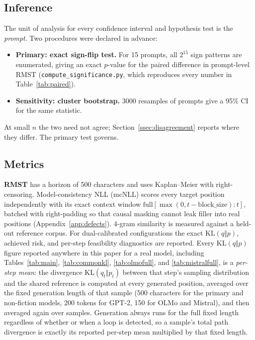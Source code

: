 \documentclass[11pt]{article}
\newcommand{\KL}{\mathrm{KL}}
\begin{document}
\subsection{Inference}
\label{ssec:inference}
The unit of analysis for every confidence interval and hypothesis test is the \emph{prompt}. Two procedures were declared in advance:
\begin{itemize}[leftmargin=*]
  \item \textbf{Primary: exact sign-flip test.} For 15 prompts, all $2^{15}$ sign patterns are enumerated, giving an exact $p$-value for the paired difference in prompt-level RMST (\texttt{compute\_\allowbreak{}significance.py}, which reproduces every number in Table~\ref{tab:paired}).
  \item \textbf{Sensitivity: cluster bootstrap.} 3000 resamples of prompts give a 95\% CI for the same statistic.
\end{itemize}
At small $n$ the two need not agree; Section~\ref{ssec:disagreement} reports where they differ. The primary test governs.

\subsection{Metrics}
\textbf{RMST} has a horizon of 500 characters and uses Kaplan--Meier with right-censoring. Model-consistency NLL (mcNLL) scores every target position independently with its exact context window $\text{full}[\max(0,t{-}\text{block\_size}):t]$, batched with right-padding so that causal masking cannot leak filler into real positions (Appendix~\ref{app:defects}). 4-gram similarity is measured against a held-out reference corpus. For dual-calibrated configurations the exact $\KL(q\Vert p)$, achieved risk, and per-step feasibility diagnostics are reported. Every $\KL(q\Vert p)$ figure reported anywhere in this paper for a real model, including Tables~\ref{tab:main}, \ref{tab:commonkl}, \ref{tab:olmofull}, and \ref{tab:mistralfull}, is a \emph{per-step mean}: the divergence $\KL(q_t\Vert p_t)$ between that step's sampling distribution and the shared reference is computed at every generated position, averaged over the fixed generation length of that sample (500 characters for the primary and non-fiction models, 200 tokens for GPT-2, 150 for OLMo and Mistral), and then averaged again over samples. Generation always runs for the full fixed length regardless of whether or when a loop is detected, so a sample's total path divergence is exactly its reported per-step mean multiplied by that fixed length.
\end{document}
